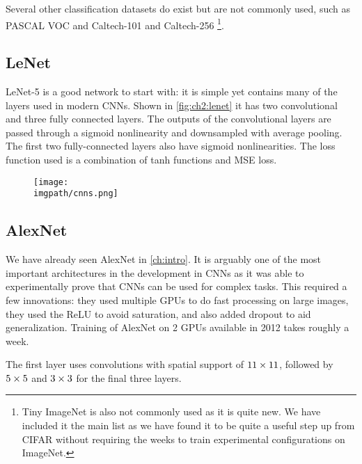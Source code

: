 Several other classification datasets do exist but are not commonly used, such
as PASCAL VOC \cite{Everingham15} and Caltech-101 and Caltech-256
\cite{li_fei-fei_learning_2004}\footnote{Tiny ImageNet is also not commonly
used as it is quite new. We have included it the main list as we have found it
to be quite a useful step up from CIFAR without requiring the weeks to train
experimental configurations on ImageNet.}.

\subsection{LeNet}
LeNet-5 \cite{lecun_gradient-based_1998} is a good network to start with: it
is simple yet contains many of the layers used in modern CNNs. Shown in
\autoref{fig:ch2:lenet} it has two convolutional and three fully connected
layers. The outputs of the convolutional layers are passed through a sigmoid
nonlinearity and downsampled with average pooling. The first two fully-connected
layers also have sigmoid nonlinearities. The loss function used is a combination
of tanh functions and MSE loss.

\begin{figure}
  \centering
  \texttt{[image: \\imgpath/cnns.png]}
  \label{fig:ch2:lenet}
\end{figure}

\subsection{AlexNet}
We have already seen AlexNet \cite{krizhevsky_imagenet_2012} in \autoref{ch:intro}.
It is arguably one of the most important architectures in the development in CNNs as it
was able to experimentally prove that CNNs can be used for complex tasks. This
required a few innovations: they used multiple GPUs to do fast
processing on large images, they used the ReLU to avoid saturation, and also added dropout
to aid generalization. Training of AlexNet on 2 GPUs available in 2012 takes
roughly a week.

The first layer uses convolutions with spatial support of $11\times11$, followed
by $5\times 5$ and $3\times 3$ for the final three layers.

